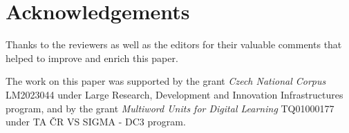 \documentclass[output=paper,colorlinks,citecolor=brown]{langscibook}
\begin{document}
\section*{Acknowledgements}\largerpage[2]

Thanks to the reviewers as well as the editors for their valuable comments that helped to improve and enrich this paper.

The work on this paper was supported by the grant \emph{Czech National Corpus} LM2023044 under Large Research, Development and Innovation Infrastructures program, and by the grant \emph{Multiword Units for Digital Learning} TQ01000177 under TA ČR VS SIGMA - DC3 program.

\printbibliography[heading=subbibliography,notkeyword=this]
\end{document}

